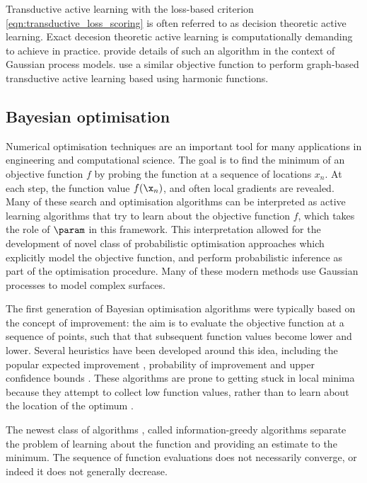 Transductive active learning with the loss-based criterion \eqref{eqn:transductive_loss_scoring} is often referred to as decision theoretic active learning. Exact decesion theoretic active learning is computationally demanding to achieve in practice. \citet{Kapoor2007} provide details of such an algorithm in the context of Gaussian process models. \citet{Zhu2003active} use a similar objective function to perform graph-based transductive active learning based using harmonic functions.

\subsection{Bayesian optimisation}

Numerical optimisation techniques are an important tool for many applications in engineering and computational science.
The goal is to find the minimum of an objective function $f$ by probing the function at a sequence of locations $x_n$. At each step, the function value $f(\x_n)$, and often local gradients are revealed. Many of these search and optimisation algorithms can be interpreted as active learning algorithms that try to learn about the objective function $f$, which takes the role of $\param$ in this framework. This interpretation allowed for the development of novel class of probabilistic optimisation approaches which explicitly model the objective function, and perform probabilistic inference as part of the optimisation procedure. Many of these modern methods use Gaussian processes to model complex surfaces.

The first generation of Bayesian optimisation algorithms were typically based on the concept of improvement: the aim is to evaluate the objective function at a sequence of points, such that that subsequent function values become lower and lower. Several heuristics have been developed around this idea, including the popular expected improvement \citep{Mockus1982,Jones1998, Frean2008}, probability of improvement \citep{Jones2001,Lizotte2008} and upper confidence bounds \citep{Srinivas2009}. These algorithms are prone to getting stuck in local minima because they attempt to collect low function values, rather than to learn about the location of the optimum \citep{Hennig2012entropy}.

The newest class of algorithms \citep{Hennig2012entropy}, called information-greedy algorithms separate the problem of learning about the function and providing an estimate to the minimum. The sequence of function evaluations does not necessarily converge, or indeed it does not generally decrease.

